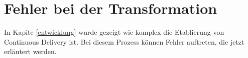 \section{Fehler bei der Transformation}
In Kapite {\ref{entwicklung}} wurde gezeigt wie komplex die Etablierung von Continuous Delivery ist. Bei diesem Prozess können Fehler auftreten, die jetzt erläutert werden. 